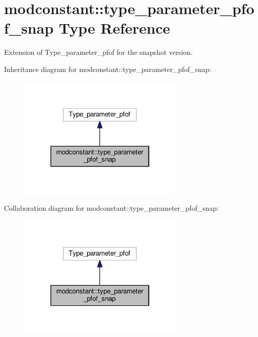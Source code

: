\hypertarget{structmodconstant_1_1type__parameter__pfof__snap}{\section{modconstant\-:\-:type\-\_\-parameter\-\_\-pfof\-\_\-snap Type Reference}
\label{structmodconstant_1_1type__parameter__pfof__snap}
}


Extension of Type\-\_\-parameter\-\_\-pfof for the snapshot version.  




Inheritance diagram for modconstant\-:\-:type\-\_\-parameter\-\_\-pfof\-\_\-snap\-:\nopagebreak
\begin{figure}[H]
\begin{center}
\leavevmode
\includegraphics[width=226pt]{structmodconstant_1_1type__parameter__pfof__snap__inherit__graph}
\end{center}
\end{figure}


Collaboration diagram for modconstant\-:\-:type\-\_\-parameter\-\_\-pfof\-\_\-snap\-:\nopagebreak
\begin{figure}[H]
\begin{center}
\leavevmode
\includegraphics[width=226pt]{structmodconstant_1_1type__parameter__pfof__snap__coll__graph}
\end{center}
\end{figure}
